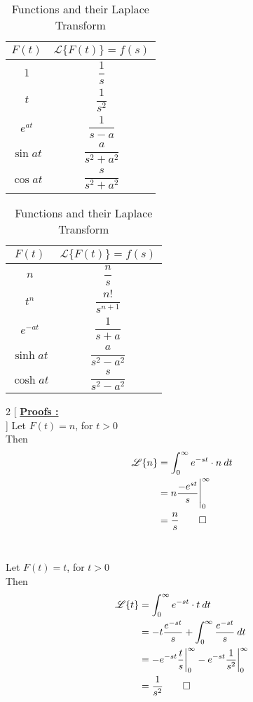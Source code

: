 \documentclass[12pt]{article}
\newcommand{\Lap}{\mathscr{L}}
\begin{document}
\vspace{20pt}
\begin{table}[htpb]
    \centering

    \begin{tabular}{c | c}
        \hline
        $F(t)$ &  $\Lap\{ F(t) \} = f(s)$ \\
        \hline\hline
        $1$ & $\dfrac{1}{s}$ \\\hline
        $t$ & $\dfrac{1}{s^2}$ \\\hline
        $e^{at}$ & $\dfrac{1}{s-a}$ \\\hline
        $\sin{at}$ & $\dfrac{a}{s^2+a^2}$ \\\hline
        $\cos{at}$ & $\dfrac{s}{s^2+a^2}$ \\
        \hline
    \end{tabular}
    \begin{tabular}{c | c}
        \hline
        $F(t)$ &  $\Lap\{ F(t) \} = f(s)$ \\
        \hline\hline
        $n$ & $\dfrac{n}{s}$ \\\hline
        $t^n$ &  $\dfrac{n!}{s^{n+1}}$ \\\hline
        $e^{-at}$ & $\dfrac{1}{s+a}$ \\\hline
        $\sinh{at}$ & $\dfrac{a}{s^2-a^2}$ \\\hline
        $\cosh{at}$ &  $\dfrac{s}{s^2-a^2}$ \\
        \hline
    \end{tabular}

    \caption{Functions and their Laplace Transform}
    \label{LapTable}
\end{table}

\newpage
\begin{multicols}{2}
    [
    \underline{\textbf{Proofs :}}\\
    ]
    Let $F(t) = n$, for $t>0$\\
    Then\\
    \begin{align*}
        \Lap \{ n \} &= \int_{0}^{\infty} { e^{-st} \cdot n } \: d{t} \\
                     &= \eval{ n\frac{-e^{st}}{s} }_{0}^{\infty} \\
                     &= \frac{n}{s}\qed
    \end{align*}\\
    \columnbreak

    Let $F(t) = t$, for $t>0$\\
    Then\\
    \begin{align*}
        \Lap \{ t \} &= \int_{0}^{\infty} { e^{-st} \cdot t } \: d{t} \\
                     &= -t \frac{e^{-st}}{s} + \int_{0}^{\infty} {\frac{e^{-st}}{s}} \: d{t} \\
                     &= -e^{-st}\frac{t}{s}\bigg|_{0}^{\infty} - e^{-st}\frac{1}{s^2}\bigg|_{0}^{\infty} \\
                     &= \frac{1}{s^2}\qed
    \end{align*}
\end{multicols}
\end{document}
